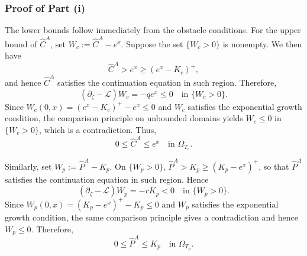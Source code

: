 \documentclass[11pt, a4paper, leqno]{amsart}
\numberwithin{equation}{section}
\theoremstyle{plain}
\theoremstyle{definition}
\theoremstyle{remark}
\def\leq{\leqslant}
\def\geq{\geqslant}
\begin{document}
{
\subsubsection*{Proof of Part (i)}

The lower bounds follow immediately from the obstacle conditions.
For the upper bound of $\widehat{C}^A$, set
$W_c:=\widehat{C}^A-e^x$. 
Suppose the set $\{W_c>0\}$ is nonempty.
We then have
\[
    \widehat{C}^A>e^x\geq(e^x-K_c)^+,
\]
and hence $\widehat{C}^A$ satisfies the continuation equation in such region.
Therefore,
\[
    (\partial_\zeta-\mathcal L)W_c=-qe^x\leq0
    \quad\text{in }\{W_c>0\}.
\]
Since $W_c(0,x)=(e^x-K_c)^+-e^x\leq0$ and $W_c$ satisfies the exponential growth condition, the comparison principle
on unbounded domains \cite[Theorem 1.1]{YY08} yields $W_c\leq0$ in $\{W_c>0\}$, which is a contradiction.
Thus,
\[
    0\leq\widehat{C}^A\leq e^x
    \quad\text{in }\Omega_{T_c}.
\]

Similarly, set $W_p:=\widehat{P}^A-K_p$. On $\{W_p>0\}$,
$\widehat{P}^A>K_p\geq(K_p-e^x)^+$, so that
$\widehat{P}^A$ satisfies the continuation equation in such region. Hence
\[
    (\partial_\zeta-\mathcal L)W_p=-rK_p<0
    \quad\text{in }\{W_p>0\}.
\]
Since $W_p(0,x)=(K_p-e^x)^+-K_p\leq0$ and {$W_p$} satisfies the exponential growth condition, the same comparison
principle gives {a} contradiction and hence $W_p\leq0$. Therefore,
\[
    0\leq\widehat{P}^A\leq K_p
    \quad\text{in }\Omega_{T_p}.\]
}
\end{document}
